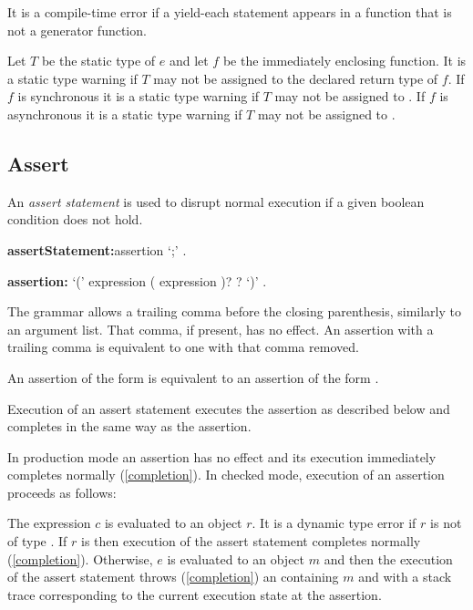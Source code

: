 \documentclass{article}
\begin{document}
\LMHash{}
It is a compile-time error if a yield-each statement appears in a function that is not a generator function.

\LMHash{}
Let $T$ be the static type of $e$ and let $f$ be the immediately enclosing function.
It is a static type warning if $T$ may not be assigned to the declared return type of $f$.
If $f$ is synchronous it is a static type warning if $T$ may not be assigned to .
If $f$ is asynchronous it is a static type warning if $T$ may not be assigned to .


\subsection{Assert}

\LMHash{}
An {\em assert statement} is used to disrupt normal execution if a given boolean condition does not hold.

\begin{grammar}
{\bf assertStatement:}assertion `{\escapegrammar ;}'
  .

{\bf assertion:}\ASSERT{} `(' expression (\gcomma{} expression )? \gcomma{}? `)'
  .
\end{grammar}

\LMHash{}
The grammar allows a trailing comma before the closing parenthesis,
similarly to an argument list.
That comma, if present, has no effect.
An assertion with a trailing comma is equivalent to one with that comma removed.

\LMHash{}
An assertion of the form  is equivalent to an assertion of the form .

\LMHash{}
Execution of an assert statement executes the assertion as described below
and completes in the same way as the assertion.

\LMHash{}
In production mode an assertion has no effect
and its execution immediately completes normally (\ref{completion}).
In checked mode,
execution of an assertion  proceeds as follows:

\LMHash{}
The expression $c$ is evaluated to an object $r$.
It is a dynamic type error if $r$ is not of type .
If $r$ is \TRUE{} then execution of the assert statement completes normally (\ref{completion}).
Otherwise, $e$ is evaluated to an object $m$
and then the execution of the assert statement throws (\ref{completion}) an  containing $m$ and with a stack trace corresponding to the current execution state at the assertion.
\end{document}
